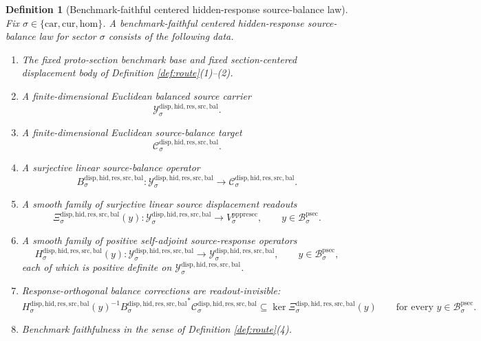 \documentclass[11pt]{article}
\newcommand{\Car}{\mathrm{car}}
\newcommand{\Cur}{\mathrm{cur}}
\newcommand{\Hom}{\mathrm{hom}}
\newcommand{\ProtoSectionBody}[1]{\mathcal B_{#1}^{\mathrm{psec}}}
\newcommand{\PrePreProtoSectionVertical}[1]{V_{#1}^{\mathrm{pppresec}}}
\newcommand{\BalancedSourceCarrier}[1]{\mathcal Y_{#1}^{\mathrm{disp,hid,res,src,bal}}}
\newcommand{\SourceBalanceTarget}[1]{\mathcal C_{#1}^{\mathrm{disp,hid,res,src,bal}}}
\newcommand{\SourceBalanceOperator}[1]{B_{#1}^{\mathrm{disp,hid,res,src,bal}}}
\newcommand{\SourceBalanceReadout}[1]{\Xi_{#1}^{\mathrm{disp,hid,res,src,bal}}}
\newcommand{\SourceBalanceResponse}[1]{H_{#1}^{\mathrm{disp,hid,res,src,bal}}}
\newtheorem{definition}{Definition}
\begin{document}
\begin{definition}[Benchmark-faithful centered hidden-response source-balance law]
\label{def:balance}
Fix \(\sigma\in\{\Car,\Cur,\Hom\}\). A \emph{benchmark-faithful centered hidden-response source-balance law} for sector \(\sigma\) consists of the following data.
\begin{enumerate}
    \item The fixed proto-section benchmark base and fixed section-centered displacement body of Definition \ref{def:route}(1)--(2).
    \item A finite-dimensional Euclidean balanced source carrier
    \[
    \BalancedSourceCarrier{\sigma}.
    \]
    \item A finite-dimensional Euclidean source-balance target
    \[
    \SourceBalanceTarget{\sigma}.
    \]
    \item A surjective linear source-balance operator
    \[
    \SourceBalanceOperator{\sigma}:
    \BalancedSourceCarrier{\sigma}\to\SourceBalanceTarget{\sigma}.
    \]
    \item A smooth family of surjective linear source displacement readouts
    \[
    \SourceBalanceReadout{\sigma}(y):
    \BalancedSourceCarrier{\sigma}\to\PrePreProtoSectionVertical{\sigma},
    \qquad
    y\in\ProtoSectionBody{\sigma}.
    \]
    \item A smooth family of positive self-adjoint source-response operators
    \[
    \SourceBalanceResponse{\sigma}(y):
    \BalancedSourceCarrier{\sigma}\to\BalancedSourceCarrier{\sigma},
    \qquad
    y\in\ProtoSectionBody{\sigma},
    \]
    each of which is positive definite on \(\BalancedSourceCarrier{\sigma}\).
    \item Response-orthogonal balance corrections are readout-invisible:
    \[
    \SourceBalanceResponse{\sigma}(y)^{-1}
    {\SourceBalanceOperator{\sigma}}^{*}
    \SourceBalanceTarget{\sigma}
    \subseteq
    \ker \SourceBalanceReadout{\sigma}(y)
    \qquad
    \text{for every }
    y\in\ProtoSectionBody{\sigma}.
    \]
    \item Benchmark faithfulness in the sense of Definition \ref{def:route}(4).
\end{enumerate}
\end{definition}
\end{document}
